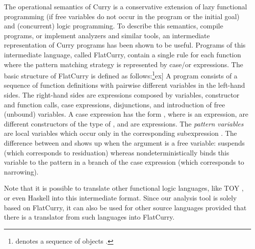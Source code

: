 \documentclass{llncs}
\begin{document}
The operational semantics of Curry \cite{AlbertHanusHuchOliverVidal05,Hanus97POPL}
is a conservative extension of lazy functional programming (if free variables
do not occur in the program or the initial goal) and (concurrent)
logic programming.
To describe this semantics, compile programs, or implement analyzers and
similar tools, an intermediate representation of Curry programs has been
shown to be useful.
Programs of this intermediate language, called FlatCurry,
contain a single rule for each function where the pattern matching strategy
is represented by case/or expressions.
The basic structure of FlatCurry is defined as follows:\footnote{ denotes a sequence of objects .}\2ex]
A program  consists of a sequence of
function definitions  with pairwise different variables in the left-hand sides.
The right-hand sides are expressions  composed by variables, constructor and
function calls, case expressions, disjunctions,
and introduction of free (unbound) variables.
A case expression has the form
,
where  is an expression,  are different 
constructors of the
type of , and  are expressions.
The \emph{pattern variables}  are local
variables which occur only in the corresponding subexpression .
The difference between  and  shows up when the
argument  is a free variable:
 suspends (which corresponds to residuation)
whereas  nondeterministically binds this variable
to the pattern in a branch of the case expression
(which corresponds to narrowing).

Note that it is possible to translate other functional logic
languages, like TOY \cite{Lopez-FraguasSanchez-Hernandez99},
or even Haskell into this intermediate format.
Since our analysis tool is solely based on FlatCurry,
it can also be used for other source languages provided that
there is a translator from such languages into FlatCurry.
\end{document}
